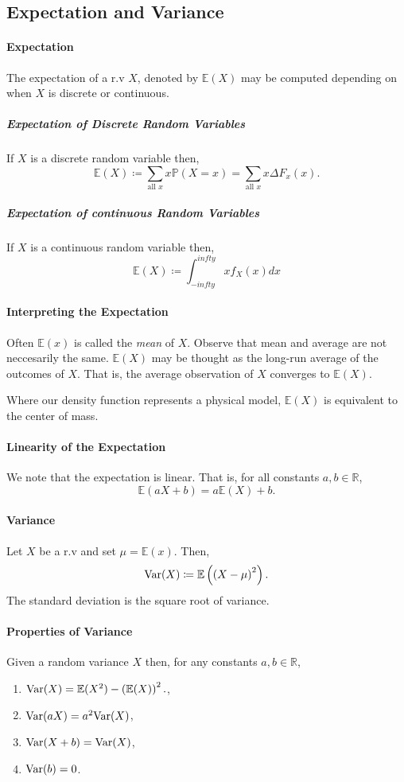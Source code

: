 \subsection{Expectation and Variance}

\paragraph{Expectation}
The expectation of a r.v \(X\), denoted by \(\mathbb{E}(X)\) may be
computed depending on when \(X\) is discrete or continuous.
\subparagraph{Expectation of Discrete Random Variables}
If \(X\) is a discrete random variable then,
\[
    \mathbb{E}(X) \coloneqq
    \sum_{\text{all } x} x \mathbb{P}(X = x)
    =
    \sum_{\text{all } x} x\Delta F_x(x).
\]
\subparagraph{Expectation of continuous Random Variables}
If \(X\) is a continuous random variable then,
\[
    \mathbb{E}(X) \coloneqq
    \int_{-infty}^{infty} x f_X(x)dx
\]

\paragraph{Interpreting the Expectation}
Often \(\mathbb{E}(x)\) is called the \textit{mean} of \(X\).
Observe that mean and average are not neccesarily the same.
\(\mathbb{E}(X)\) may be thought as the long-run average of
the outcomes of \(X\). That is, the average observation of 
\(X\) converges to \(\mathbb{E}(X)\).

Where our density function represents a physical model, \(\mathbb{E}(X)\)
is equivalent to the center of mass.


\paragraph{Linearity of the Expectation}
We note that the expectation is linear. That is, for all constants
\(a, b \in \mathbb{R}\),
\[
    \mathbb{E}(aX + b) = a \mathbb{E}(X) + b.
\]

\paragraph{Variance}
Let \(X\) be a r.v and set \(\mu = \mathbb{E}(x)\).
Then,
\[
    \mathrm{Var}(X) \coloneqq
    \mathbb{E}\left(
        \left(X - \mu \right)^2
    \right).
\]
The standard deviation is the square root of variance.

\paragraph{Properties of Variance}
Given a random variance \(X\) then, for any constants
\(a, b \in \mathbb{R}\),
\begin{enumerate}
    \item \(\mathrm{Var}(X) = \mathbb{E}(X^2) - \left(\mathbb{E}(X)\right)^2.\),
    \item \(\mathrm{Var}(aX) = a^2 \mathrm{Var}(X)\),
    \item \(\mathrm{Var}(X + b) = \mathrm{Var}(X)\),
    \item \(\mathrm{Var}(b) = 0\).
\end{enumerate}

